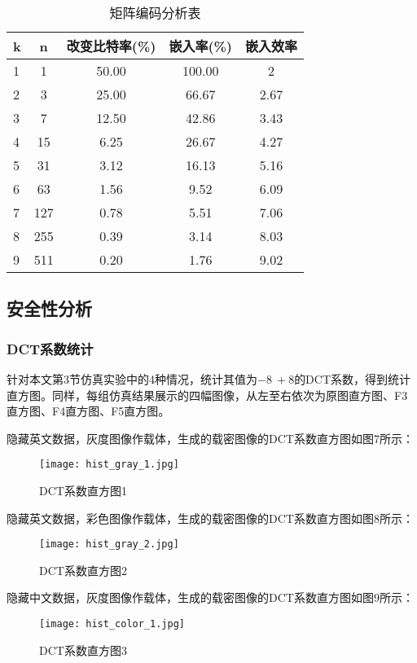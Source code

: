 \documentclass[onecolumn,a4paper,12pt]{article}
\begin{document}
\begin{table}[H]
\centering
\caption{矩阵编码分析表}\label{矩阵编码分析表}
\begin{tabular}{lcccc}
\hline
k &n &改变比特率(\%) &嵌入率(\%) &嵌入效率 \\ \hline
1 &1 &50.00 &100.00 &2 \\
2 &3 &25.00 &66.67 &2.67 \\
3 &7 &12.50 &42.86 &3.43 \\
4 &15 &6.25 &26.67 &4.27 \\
5 &31 &3.12 &16.13 &5.16 \\
6 &63 &1.56 &9.52 &6.09 \\
7 &127 &0.78 &5.51 &7.06 \\
8 &255 &0.39 &3.14 &8.03 \\
9 &511 &0.20 &1.76 &9.02 \\ \hline
\end{tabular}
\end{table}

\subsection{安全性分析}

\subsubsection{DCT系数统计}

针对本文第3节仿真实验中的4种情况，统计其值为$-8~+8$的DCT系数，得到统计直方图。同样，每组仿真结果展示的四幅图像，从左至右依次为原图直方图、F3直方图、F4直方图、F5直方图。

隐藏英文数据，灰度图像作载体，生成的载密图像的DCT系数直方图如图7所示：
\begin{figure}[H]
  \centering
  \texttt{[image: hist\_gray\_1.jpg]}\\
  \caption{DCT系数直方图1}\label{DCT系数直方图1}
\end{figure}

隐藏英文数据，彩色图像作载体，生成的载密图像的DCT系数直方图如图8所示：
\begin{figure}[H]
  \centering
  \texttt{[image: hist\_gray\_2.jpg]}\\
  \caption{DCT系数直方图2}\label{DCT系数直方图2}
\end{figure}

隐藏中文数据，灰度图像作载体，生成的载密图像的DCT系数直方图如图9所示：
\begin{figure}[H]
  \centering
  \texttt{[image: hist\_color\_1.jpg]}\\
  \caption{DCT系数直方图3}\label{DCT系数直方图3}
\end{figure}
\end{document}
